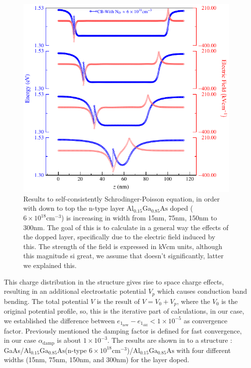 \begin{figure}[h!]
	\centering
	\includegraphics[width=\textwidth]{../figures/chapter-3/poisson/build/poisson.pdf}
	\caption{Results to self-consistently Schrodinger-Poisson equation, in order with down to top the n-type layer $\mathrm{Al_{0.15}Ga_{0.85}As}$ doped ( $6\times 10^{18} \mathrm{cm}^{-3}$) is increasing in width from 15nm, 75nm, 150nm to 300nm. The goal of this is to calculate in a general way the effects of the dopped layer, specifically due to the electric field induced by this.  The strength of the field is expressed in kVcm units, although this magnitude si great, we assume that doesn't significantly, latter we explained this.}
	\label{fig:chapter-3-pr-poisson-1}
\end{figure}
This charge distribution in the structure gives rise to space charge effects, resulting in an additional electrostatic potential $V_{p}$ which causes conduction band bending\cite{jirauschek2014modeling,jovanovic2005mechanisms}. The total potential $V$ is the result of $V=V_{0}+V_{p}$, where the $V_{0}$ is the original potential profile, so, this is the iterative part of calculations, in our case, we established the difference between $e_{{1}_{\mathrm{new}}}\! -\! e_{{1}_{\mathrm{old}}}\! <\! 1\times10^{-5}$ as convergence factor. Previously mentioned the damping factor is defined for fast convergence, in our case $\alpha_{\mathrm{damp}}$ is about $1\times 10^{-3}$. The results are shown in  to a structure :  GaAs/$\mathrm{Al_{0.15}Ga_{0.85}As}$(n-type $6\times 10^{18} \mathrm{cm}^{-3}$)/$\mathrm{Al_{0.15}Ga_{0.85}As}$ with four different widths (15nm, 75nm, 150nm, and 300nm) for the  layer doped. 

